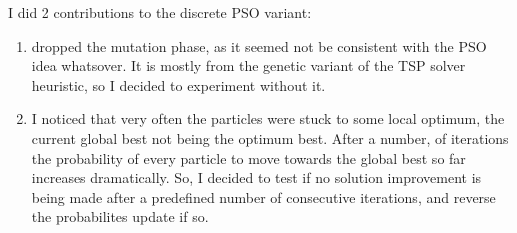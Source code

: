 I did 2 contributions to the discrete PSO variant:

\begin{enumerate}

\item dropped the mutation phase, as it seemed not be consistent with the PSO idea whatsover. It is mostly from the genetic variant of the TSP solver heuristic, so I decided to experiment without it.

\item I noticed that very often the particles were stuck to some local optimum, the current global best not being the optimum best. After a number, of iterations the probability of every particle to move towards the global best so far increases dramatically. So, I decided to test if no solution improvement is being made after a predefined number of consecutive iterations, and reverse the probabilites update if so.

\end{enumerate}
